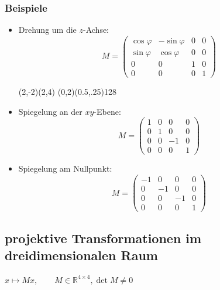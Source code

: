 \subsubsection{Beispiele}
\begin{itemize}
 \item Drehung um die $z$-Achse:
	\[M = \begin{pmatrix}
		 \cos \varphi & -\sin \varphi & 0 & 0 \\
		 \sin \varphi & \cos \varphi & 0 & 0 \\
		 0 & 0 & 1 & 0 \\
		 0 & 0 & 0 & 1
		\end{pmatrix}\]
	\begin{center}
	 \begin{pspicture}(2,-2)(2,4)
	  \pstThreeDCoor[linecolor=black]
	  \psellipticarc{->}(0,2)(0.5,.25){12}{8}
	 \end{pspicture}

	\end{center}

 \item Spiegelung an der $xy$-Ebene:
	\[M = \begin{pmatrix}
		 1 & 0 & 0 & 0 \\
		 0 & 1 & 0 & 0 \\
		 0 & 0 & -1 & 0 \\
		 0 & 0 & 0 & 1
		\end{pmatrix}\]
 \item Spiegelung am Nullpunkt:
	\[M = \begin{pmatrix}
		 -1 & 0 & 0 & 0 \\
		 0 & -1 & 0 & 0 \\
		 0 & 0 & -1 & 0 \\
		 0 & 0 & 0 & 1
		\end{pmatrix}\]
\end{itemize}

\subsection{projektive Transformationen im dreidimensionalen Raum}
$x \mapsto Mx, \qquad M \in \mathbb{R}^{4 \times 4}, \det M \neq 0$

